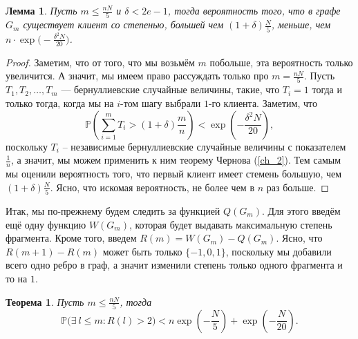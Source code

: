 \documentclass{matmex-diploma-custom}
\newcommand{\PRob}{\mathbb P}
\newcommand{\leqs}{\leqslant}
\newtheorem{theorem}{Теорема}
\newtheorem{lemma}{Лемма}
\theoremstyle{named}
\begin{document}
\begin{lemma}\label{l4}
Пусть $m \leqs \frac{nN}{5}$ и $\delta < 2e - 1$, тогда вероятность того, что в графе $G_m$ существует клиент 
со степенью, большей чем $(1+\delta)\frac{N}{5}$, меньше, чем $n \cdot \exp\big(- \frac{\delta^2 N}{20}\big)$.
\end{lemma}
\begin{proof}
Заметим, что от того, что мы возьмём $m$ побольше, эта вероятность только увеличится. 
А значит, мы имеем право рассуждать только про $m = \frac{nN}{5}$. 
Пусть $T_1, T_2, \dots, T_m$ --- бернуллиевские случайные величины, такие, что $T_i = 1$ тогда и только тогда, 
когда мы на $i$-том шагу выбрали $1$-го клиента.
Заметим, что 
\begin{equation}
\PRob\left(\sum_{i = 1}^m T_i > (1+\delta)\frac{m}{n} \right) < \exp\left(- \frac{\delta^2 N}{20} \right),
\end{equation}
поскольку $T_i$ -- независимые бернуллиевские случайные величины с показателем $\frac{1}{n}$, 
а значит, мы можем применить к ним теорему Чернова (\ref{ch_2}).
Тем самым мы оценили вероятность того, что первый клиент имеет стемень большую, чем $(1+\delta)\frac{N}{5}$.
Ясно, что искомая вероятность, не более чем в $n$ раз больше.
\end{proof}

Итак, мы по-прежнему будем следить за функцией $Q(G_m)$. Для этого введём ещё одну функцию $W(G_m)$, 
которая будет выдавать максимальную степень фрагмента.
Кроме того, введем $R(m) = W(G_m) - Q(G_m)$. 
Ясно, что $R(m+1) - R(m)$ может быть только $\{-1,0,1\}$, поскольку мы добавили всего одно ребро в граф, 
а значит изменили степень только одного фрагмента и то на $1$. 

\begin{theorem}\label{t4}
Пусть $m \leqs \frac{nN}{5}$, тогда
\begin{equation}
\PRob\Big(\exists~l \leqs m : R(l) > 2 \Big) < n\exp\left(-\frac{N}{5}\right) +  \exp\left(- \frac{N}{20}\right).
\end{equation}
\end{theorem}
\end{document}
